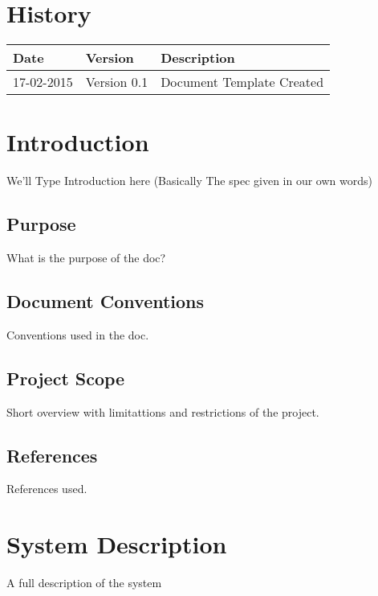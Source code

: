 \documentclass[12pt]{article}
\begin{document}


\section{History}
\begin{tabular}{|l|l|l|}

\hline
Date & Version & Description\\ %
\hline
17-02-2015 & Version 0.1 & Document Template Created\\ %

\end{tabular}

\tableofcontents

\newpage

\section{Introduction}
We'll Type Introduction here (Basically The spec given in our own words)

\subsection{Purpose}
What is the purpose of the doc?	

\subsection{Document Conventions}
Conventions used in the doc.

\subsection{Project Scope}
Short overview with limitattions and restrictions of the project.

\subsection{References}
References used.

\section{System Description}
A full description of the system
\end{document}

